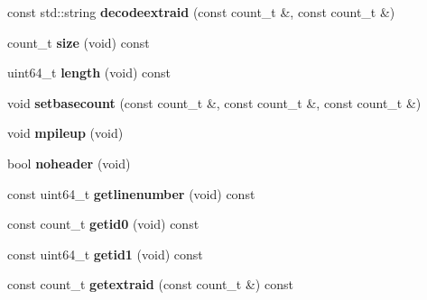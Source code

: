 \begin{DoxyCompactItemize}
\item 
\hypertarget{classprofile_af40e656795f247c0073e966543a3f296}{const std\-::string {\bfseries decodeextraid} (const count\-\_\-t \&, const count\-\_\-t \&)}\label{classprofile_af40e656795f247c0073e966543a3f296}

\item 
\hypertarget{classprofile_a482d3e2870620c87347c83a6208773f1}{count\-\_\-t {\bfseries size} (void) const }\label{classprofile_a482d3e2870620c87347c83a6208773f1}

\item 
\hypertarget{classprofile_ab949c665beb14259f8e44cbde6f54eb8}{uint64\-\_\-t {\bfseries length} (void) const }\label{classprofile_ab949c665beb14259f8e44cbde6f54eb8}

\item 
\hypertarget{classprofile_aa5b384afbc0fc9d014b4b489928ef6e7}{void {\bfseries setbasecount} (const count\-\_\-t \&, const count\-\_\-t \&, const count\-\_\-t \&)}\label{classprofile_aa5b384afbc0fc9d014b4b489928ef6e7}

\item 
\hypertarget{classprofile_a7866bf2ce66d55e69043d04e3105df18}{void {\bfseries mpileup} (void)}\label{classprofile_a7866bf2ce66d55e69043d04e3105df18}

\item 
\hypertarget{classprofile_aa5b2a0112bc3b9263c2f4fcedd68b282}{bool {\bfseries noheader} (void)}\label{classprofile_aa5b2a0112bc3b9263c2f4fcedd68b282}

\item 
\hypertarget{classprofile_af4a0d1674173165c0cd9f1d44e89b5fa}{const uint64\-\_\-t {\bfseries getlinenumber} (void) const }\label{classprofile_af4a0d1674173165c0cd9f1d44e89b5fa}

\item 
\hypertarget{classprofile_a70c5512a49bfaafaf634177fee4eb63c}{const count\-\_\-t {\bfseries getid0} (void) const }\label{classprofile_a70c5512a49bfaafaf634177fee4eb63c}

\item 
\hypertarget{classprofile_af476c0df9c0019f70e84ba8c6f76bdb1}{const uint64\-\_\-t {\bfseries getid1} (void) const }\label{classprofile_af476c0df9c0019f70e84ba8c6f76bdb1}

\item 
\hypertarget{classprofile_ac5946a156a38d75398fdddfae3312f6a}{const count\-\_\-t {\bfseries getextraid} (const count\-\_\-t \&) const }\label{classprofile_ac5946a156a38d75398fdddfae3312f6a}


\end{DoxyCompactItemize}
